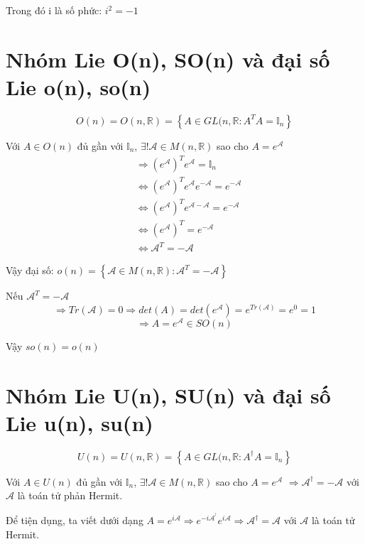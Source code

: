 \documentclass{report}
\begin{document}
Trong đó i là số phức: \( i^{2} = -1 \)

\section{Nhóm Lie O(n), SO(n) và đại số Lie o(n), so(n)}

\[ O(n) = O(n,\mathbb{R}) = \left\lbrace A \in GL(n,\mathbb{R}: A^{T}A = \mathbb{I}_{n} \right\rbrace \]

Với \( A \in O(n) \) đủ gần với \( \mathbb{I}_{n} \), \( \exists ! \mathcal{A} \in M(n, \mathbb{R}) \) sao cho \( A = e^{\mathcal{A}} \)
	\begin{align*}
		& \Rightarrow (e^{\mathcal{A}})^T e^{\mathcal{A}} = \mathbb{I}_{n} \\
		& \Leftrightarrow (e^{\mathcal{A}})^T e^{\mathcal{A}} e^{\mathcal{-A}} = e^{\mathcal{-A}} \\
		& \Leftrightarrow (e^{\mathcal{A}})^T e^{\mathcal{A} - \mathcal{A}} = e^{\mathcal{-A}} \\
		& \Leftrightarrow (e^{\mathcal{A}})^T = e^{\mathcal{-A}} \\
		& \Leftrightarrow \mathcal{A}^T = \mathcal{-A}
	\end{align*}

Vậy đại số: \( o(n) = \left\lbrace { \mathcal{A} \in M(n,\mathbb{R}): \mathcal{A}^T = \mathcal{-A} } \right\rbrace \)

Nếu \( \mathcal{A}^T = \mathcal{-A} \)
\[ \Rightarrow Tr(\mathcal{A}) = 0 \Rightarrow det(A) = det(e^{\mathcal{A}}) = e^{Tr(\mathcal{A})} = e^{0} = 1 \]
\[ \Rightarrow A = e^{\mathcal{A}} \in SO(n)\]

Vậy \(so(n) = o(n) \)

\section{Nhóm Lie U(n), SU(n) và đại số Lie u(n), su(n)}

\[ U(n) = U(n,\mathbb{R}) = \left\lbrace A \in GL(n,\mathbb{R}: A^{\dagger}A = \mathbb{I}_{n} \right\rbrace \]

Với \( A \in U(n) \) đủ gần với \( \mathbb{I}_{n} \), \( \exists ! \mathcal{A} \in M(n, \mathbb{R}) \) sao cho \( A = e^{\mathcal{A}} \) \( \Rightarrow \mathcal{A}^{\dagger} = \mathcal{-A} \) với \( \mathcal{A} \) là toán tử phản Hermit.

Để tiện dụng, ta viết dưới dạng \( A = e^{ i \mathcal{A} } \Rightarrow e^{-i \mathcal{A}^{^{\dagger} }}e^{i \mathcal{A}} \Rightarrow \mathcal{A}^{\dagger} = \mathcal{A} \) với \( \mathcal{A} \) là toán tử Hermit.
\end{document}
